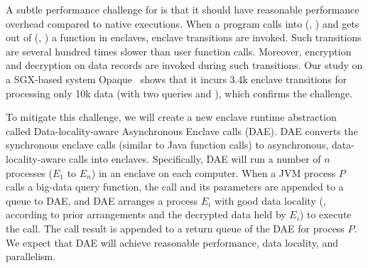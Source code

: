 


A subtle performance challenge for \maat is that it should have reasonable 
performance overhead compared to native executions. When a program calls into 
(\ie, ) and gets out of (\ie, ) a function in enclaves, 
enclave transitions are invoked. Such transitions are several hundred times 
slower than user function calls. Moreover, encryption and decryption on data 
records are invoked during such transitions. Our study on a SGX-based system 
Opaque~\cite{opaque:nsdi17} shows that it incurs 3.4k enclave transitions for 
processing only 10k data (with two queries  and ), which 
confirms the challenge.





To mitigate this challenge, we will create a new enclave runtime abstraction 
called Data-locality-aware Asynchronous Enclave calls (DAE). DAE converts the 
synchronous enclave calls (similar to Java function calls) to asynchronous, 
data-locality-aware calls into enclaves. Specifically, DAE will run a number of 
$n$ processes ($E_{1}$ to $E_{n}$) in an enclave on each computer. When a 
JVM process $P$ calls a big-data query function, the call and its parameters 
are appended to a queue to DAE, and DAE arranges a process $E_{i}$ with good 
data locality (\eg, according to prior arrangements and the decrypted data 
held by $E_{i}$) to execute the call. The call result is appended to a return 
queue of the DAE for process $P$. We expect that DAE will achieve reasonable 
performance, data locality, and parallelism.

